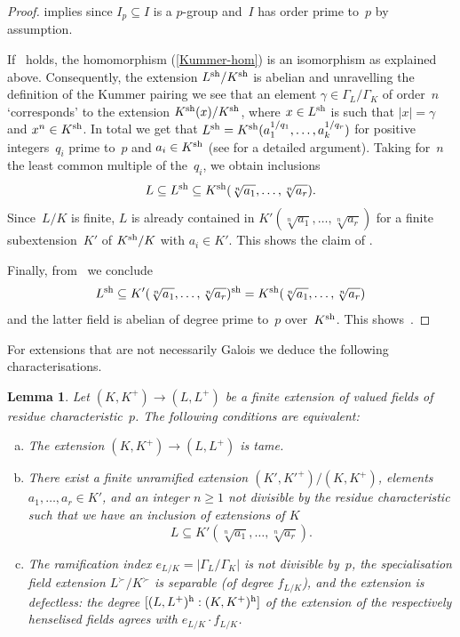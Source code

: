 \documentclass[a4paper,twoside,11pt,reqno]{amsart}
\newcommand{\sh}{{\rm sh}}   %
\newcommand{\rh}{{\rm h}}  %
\newtheorem{lem}[thm]{Lemma}
\theoremstyle{definition}
\numberwithin{equation}{subsection}
\begin{document}
\begin{proof}
     implies  since $I_p \subseteq I$ is a $p$-group and~$I$ has order prime to~$p$ by assumption.
    
    If~ holds, the homomorphism (\ref{Kummer-hom}) is an isomorphism as explained above.
    Consequently, the extension $L^\sh/K^\sh$ is abelian and unravelling the definition of the Kummer pairing we see that an element $\gamma \in \Gamma_L/\Gamma_K$ of order~$n$ `corresponds' to the extension $K^\sh(x)/K^\sh$, where $x \in L^\sh$ is such that $\lvert x \rvert = \gamma$ and $x^n \in K^\sh$.
    In total we get that $L^\sh = K^\sh(a_1^{1/q_1},\ldots,a_k^{1/q_r})$  for positive integers~$q_i$ prime to~$p$ and $a_i \in K^\sh$ (see \cite[Corollary 6.2.14]{GabberRamero} for a detailed argument).
    Taking for~$n$ the least common multiple of the~$q_i$, we obtain inclusions
    \[
      L \subseteq L^\sh \subseteq K^\sh(\sqrt[n]{a_1}, \ldots, \sqrt[n]{a_r}).      
    \]
    Since~$L/K$ is finite, $L$ is already contained in $K'(\sqrt[n]{a_1}, \ldots, \sqrt[n]{a_r})$ for a finite subextension~$K'$ of $K^\sh/K$ with $a_i \in K'$.
    This shows the claim of .
   
    Finally, from~ we conclude
    \[
     L^\sh \subseteq K'(\sqrt[n]{a_1}, \ldots, \sqrt[n]{a_r})^\sh = K^\sh(\sqrt[n]{a_1}, \ldots, \sqrt[n]{a_r})
    \]
    and the latter field is abelian of degree prime to~$p$ over~$K^\sh$.
    This shows~.
\end{proof}

For extensions that are not necessarily Galois we deduce the following characterisations.

\begin{lem} \label{lem:tameness-conditions}
    Let $(K,K^+) \to (L,L^+)$ be a finite extension of valued fields of residue characteristic~$p$. 
    The following conditions are equivalent: 
    \begin{enumerate}[(a)]
        \item 
        \label{lemitem:tame1}
        The extension $(K,K^+) \to (L,L^+)$ is tame.
        \item
        \label{lemitem:tame-abhyankar1}
        There exist a finite unramified extension $(K',K'^+)/(K,K^+)$, elements $a_1, \ldots, a_r\in K'$, and an integer $n\geq 1$ not divisible by the residue characteristic such that we have an inclusion of extensions of $K$
        \[ 
            L \subseteq K'(\sqrt[n]{a_1}, \ldots, \sqrt[n]{a_r}).
        \]
        \item 
        \label{lemitem:tame-numerical}
        The ramification index $e_{L/K} = \lvert \Gamma_L/\Gamma_K \rvert$ is not divisible by~$p$, the specialisation field extension $L^\succ/K^\succ$ is separable (of degree $f_{L/K}$), and the extension is defectless: the degree $[(L,L^+)^{\rh}:(K,K^+)^{\rh}]$ of the extension of the respectively henselised fields agrees with $e_{L/K} \cdot f_{L/K}$.
    \end{enumerate}
\end{lem}
\end{document}
